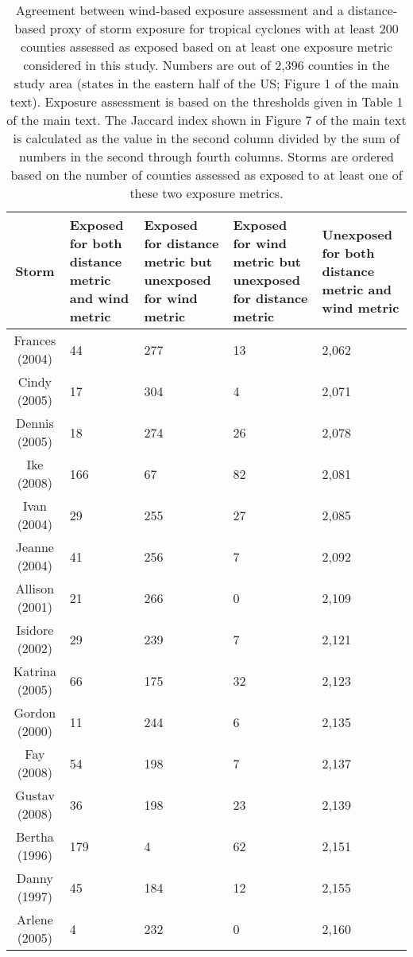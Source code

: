 \begin{table}[ht]
\centering
\caption{Agreement between wind-based exposure assessment and a distance-based
         proxy of storm exposure for tropical cyclones with at least 200 counties assessed 
         as exposed based on at least one exposure metric considered in this study. Numbers 
         are out of 2,396 counties in the study area (states in the eastern half of the US; 
         Figure 1 of the main text). Exposure assessment is based on the thresholds given in 
         Table 1 of the main text. The Jaccard index shown in Figure 7 of the main text is 
         calculated as the value in the second column divided by the sum of numbers in the 
         second through fourth columns.  Storms are ordered based on the number of counties 
         assessed as exposed to at least one of these two exposure metrics.} 
\label{tab:misclasswind}
\begin{tabular}{cP{3cm}P{3cm}P{3cm}P{3cm}}
  \toprule
Storm & Exposed for both distance metric and wind metric & Exposed for distance metric but unexposed for wind metric & Exposed for wind metric but unexposed for distance metric & Unexposed for both distance metric and wind metric \\ 
  \midrule
Frances (2004) & 44 & 277 & 13 & 2,062 \\ 
  Cindy (2005) & 17 & 304 & 4 & 2,071 \\ 
  Dennis (2005) & 18 & 274 & 26 & 2,078 \\ 
  Ike (2008) & 166 & 67 & 82 & 2,081 \\ 
  Ivan (2004) & 29 & 255 & 27 & 2,085 \\ 
  Jeanne (2004) & 41 & 256 & 7 & 2,092 \\ 
  Allison (2001) & 21 & 266 & 0 & 2,109 \\ 
  Isidore (2002) & 29 & 239 & 7 & 2,121 \\ 
  Katrina (2005) & 66 & 175 & 32 & 2,123 \\ 
  Gordon (2000) & 11 & 244 & 6 & 2,135 \\ 
  Fay (2008) & 54 & 198 & 7 & 2,137 \\ 
  Gustav (2008) & 36 & 198 & 23 & 2,139 \\ 
  Bertha (1996) & 179 & 4 & 62 & 2,151 \\ 
  Danny (1997) & 45 & 184 & 12 & 2,155 \\ 
  Arlene (2005) & 4 & 232 & 0 & 2,160 \\ 

\end{tabular}
\end{table}
